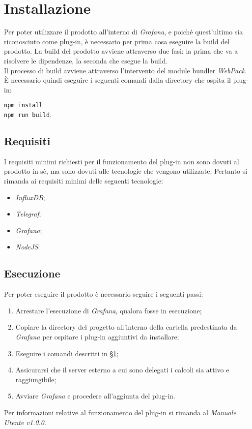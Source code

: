 \section{Installazione}\label{Installazione}
Per poter utilizzare il prodotto all'interno di \textit{Grafana}, e poiché quest'ultimo sia riconosciuto come plug-in, è necessario per prima cosa eseguire la build del prodotto.
La build del prodotto avviene attraverso due fasi: la prima che va a risolvere le dipendenze, la seconda che esegue la build.\\
Il processo di build avviene attraverso l'intervento del module bundler \textit{WebPack}.
È necessario quindi eseguire i seguenti comandi dalla directory che ospita il plug-in:
\begin{center}
	\texttt{npm install}\\
	\texttt{npm run build}.
\end{center}

\subsection{Requisiti}\label{Requisiti}
I requisiti minimi richiesti per il funzionamento del plug-in non sono dovuti al prodotto in sè, ma sono dovuti alle tecnologie che vengono utilizzate. Pertanto si rimanda ai requisiti minimi delle seguenti tecnologie:
\begin{itemize}
	\item \textit{InfluxDB};
	\item \textit{Telegraf};
	\item \textit{Grafana};
	\item \textit{NodeJS}.
\end{itemize}

\subsection{Esecuzione}\label{run}
Per poter eseguire il prodotto è necessario seguire i seguenti passi:
\begin{enumerate}
	\item Arrestare l'esecuzione di \textit{Grafana}, qualora fosse in esecuzione;
	\item Copiare la directory del progetto all'interno della cartella predestinata da \textit{Grafana} per ospitare i plug-in aggiuntivi da installare;
	\item Eseguire i comandi descritti in §\ref{Installazione};
	\item Assicurarsi che il server esterno a cui sono delegati i calcoli sia attivo e raggiungibile;
	\item Avviare \textit{Grafana} e procedere all'aggiunta del plug-in.
\end{enumerate}
Per informazioni relative al funzionamento del plug-in si rimanda al \textit{Manuale Utente v1.0.0}.